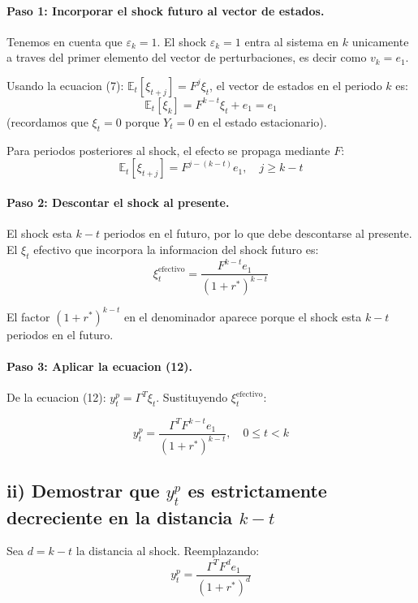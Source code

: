 \paragraph{Paso 1: Incorporar el shock futuro al vector de estados.}

Tenemos en cuenta que $\varepsilon_k = 1$. El shock $\varepsilon_k = 1$ entra al sistema en $k$ unicamente a traves del primer elemento del vector de perturbaciones, es decir como $v_k = e_1$.

Usando la ecuacion (7): $\mathbb{E}_t[\xi_{t+j}] = F^j \xi_t$, el vector de estados en el periodo $k$ es:
\[
    \mathbb{E}_t[\xi_k] = F^{k-t}\xi_t + e_1 = e_1
\]
(recordamos que $\xi_t = 0$ porque $Y_t = 0$ en el estado estacionario).

Para periodos posteriores al shock, el efecto se propaga mediante $F$:
\[
    \mathbb{E}_t[\xi_{t+j}] = F^{j-(k-t)} e_1, \quad j \geq k-t
\]

\paragraph{Paso 2: Descontar el shock al presente.}

El shock esta $k-t$ periodos en el futuro, por lo que debe descontarse al presente. El $\xi_t$ efectivo que incorpora la informacion del shock futuro es:
\[
    \xi_t^{\text{efectivo}} = \frac{F^{k-t} e_1}{(1+r^*)^{k-t}}
\]

El factor $(1+r^*)^{k-t}$ en el denominador aparece porque el shock esta $k-t$ periodos en el futuro.

\paragraph{Paso 3: Aplicar la ecuacion (12).}

De la ecuacion (12): $y_t^p = \Gamma^T \xi_t$. Sustituyendo $\xi_t^{\text{efectivo}}$:

\begin{resultado}
\[
    y_t^p = \frac{\Gamma^T F^{k-t} e_1}{(1+r^*)^{k-t}}, \quad 0 \leq t < k
\]
\end{resultado}

\subsection*{ii) Demostrar que $y_t^p$ es estrictamente decreciente en la distancia $k-t$}

Sea $d = k-t$ la distancia al shock. Reemplazando:
\[
    y_t^p = \frac{\Gamma^T F^d e_1}{(1+r^*)^d}
\]

